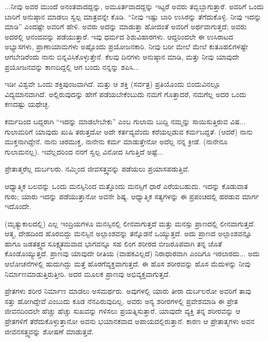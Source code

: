 ...ನೀವು ಅವರ ಮುಂದೆ ಅನಂತವಾದದ್ದನ್ನು, ಅಮೂರ್ತವಾದದ್ದನ್ನು ಇಟ್ಟರೆ ಅವರು ತಬ್ಬಿಬ್ಬಾಗುತ್ತಾರೆ. ಅವರಿಗೆ ಒಂದು ಬಾರಿಗೆ ಅನುಷ್ಠಾನ ಮಾಡಲು ಸ್ವಲ್ಪ ಮಾತ್ರವನ್ನೇ ಕೊಡಿ. “ನೀವು ಇಷ್ಟು ಬಾರಿ ಉಸಿರನ್ನು ತೆಗೆದುಕೊಳ್ಳಿ. ನೀವು ಇದನ್ನು ಮಾಡಿ'' ಎಂದಷ್ಟೇ ಅವರಿಗೆ ಹೇಳಿ. ಅವರು ಅದನ್ನು ಮಾಡುತ್ತಾ ಹೋದಂತೆ ಅವರಿಗೆ ಅರ್ಥವಾಗುತ್ತದೆ; ಅವರು ಅದರಲ್ಲಿ ಆನಂದವನ್ನು ಪಡೆಯುತ್ತಾರೆ. ಇವು ಧರ್ಮದ ಶಿಶುವಿಹಾರಗಳು. ಆದ್ದರಿಂದಲೇ ಈ ಉಸಿರಾಟದ ಅಭ್ಯಾಸಗಳು, ಪ್ರಾಣಾಯಾಮಗಳು ಅಷ್ಟೊಂದು ಪ್ರಯೋಜನಕಾರಿ. ನೀವು ಬರೀ ಮೇಲೆ ಮೇಲೆ ಕುತೂಹಲಿಗಳಷ್ಟೇ ಆಗಬೇಡಿರೆಂದು ನಾನು ಬಿನ್ನವಿಸಿಕೊಳ್ಳುತ್ತೇನೆ. ಕೆಲವು ದಿನಗಳು ಅನುಷ್ಠಾನ ಮಾಡಿ, ಮತ್ತು ನೀವು ಯಾವುದೇ ಪ್ರಯೋಜನವನ್ನು ಕಾಣದಿದ್ದಲ್ಲಿ ಆಗ ಬಂದು ನನ್ನನ್ನು ಶಪಿಸಿ...

\vskip 6pt

ಇಡೀ ವಿಶ್ವವೇ ಒಂದು ಶಕ್ತಿಪುಂಜವಾಗಿದೆ. ಮತ್ತು ಆ ಶಕ್ತಿ (ಸರ್ವತ್ರ) ಪ್ರತಿಯೊಂದು ಬಿಂದುವಿನಲ್ಲೂ ವಿದ್ಯಮಾನವಾಗಿದೆ. ಅಲ್ಲಿರುವುದನ್ನು ಹೇಗೆ ಪಡೆಯಬೇಕೆಂಬುದು ನಮಗೆ ಗೊತ್ತಾದರೆ, ನಮಗೆಲ್ಲ ಅದರ ಒಂದು ಕಣದಷ್ಟು ಯಥೇಚ್ಛ.

\vskip 6pt

ಕರ್ಮದಿಂದ ಬದ್ದರಾಗಿ “ಇದನ್ನು ಮಾಡಲೇಬೇಕು” ಎಂಬ ಗುಲಾಮ ಬುದ್ದಿ ನಮ್ಮನ್ನು ಸಾಯಿಸುತ್ತಿರುವ ವಿಷ... ಗುಲಾಮರಿಗೆ ಯಾವುದು ಖುಷಿ ತರುತ್ತದೋ ಅದೇ ಕರ್ತವ್ಯವೆಂದು ಕರೆಯಲ್ಪಡುವ ಕರ್ಮಬದ್ದತೆ. (ಆದರೆ) ನಾನು ಮುಕ್ತನಾಗಿದ್ದೇನೆ. ನಾನು ಚಿರಮುಕ್ತ, ನಾನೇನು ಕರ್ಮ ಮಾಡುತ್ತೇನೋ ಅದೆಲ್ಲ ನನ್ನ ಕ್ರೀಡೆ. (ನಾನೇನೂ ಗುಲಾಮನಲ್ಲ). ಇವೆಲ್ಲದರಿಂದ ನನಗೆ ಸ್ವಲ್ಪ ವಿನೋದ ಸಿಗುತ್ತಿದೆ ಅಷ್ಟೆ...

\vskip 6pt

ಪ್ರೇತಾತ್ಮರೆಲ್ಲ ದುರ್ಬಲರು. ನಮ್ಮಿಂದ ಜೀವಸತ್ತ್ವವನ್ನು ಪಡೆಯಲು ಪ್ರಯಾಸಪಡುತ್ತಿವೆ.

\vskip 6pt

ಆಧ್ಯಾತ್ಮಿಕ ಬಲವನ್ನು ಒಂದು ಮನಸ್ಸಿನಿಂದ ಮತ್ತೊಂದು ಮನಸ್ಸಿಗೆ ಧಾರೆ ಎರೆಯಬಹುದು. ಇದನ್ನು ಕೊಡುವಾತ ಗುರು; ಯಾರು ಇದನ್ನು ಪಡೆಯುತ್ತಾನೋ ಅವನೇ ಶಿಷ್ಯ. ಆಧ್ಯಾತ್ಮಿಕ ಸತ್ಯಗಳನ್ನು ಈ ಪ್ರಪಂಚದಲ್ಲಿ ಹರಡುವ ಮಾರ್ಗ ಇದೊಂದೇ.

\vskip 6pt

(ಮೃತ್ಯುಕಾಲದಲ್ಲಿ) ಎಲ್ಲ ಇಂದ್ರಿಯಗಳೂ ಮನಸ್ಸಿನಲ್ಲಿ ಲೀನವಾಗುತ್ತದೆ ಮತ್ತು ಮನಸ್ಸು ಪ್ರಾಣದಲ್ಲಿ ಲೀನವಾಗುತ್ತದೆ. ಆತ್ಮ, ದೇಹದಿಂದ ಹೊರಬಿದ್ದು ಮನಸ್ಸಿನ ಅಲ್ಪಾಂಶವನ್ನು ತನ್ನೊಡನೆ ಒಯ್ಯುತ್ತದೆ. ಅದು ಪ್ರಾಣದ ಅಲ್ಪಾಂಶವನ್ನೂ ಹಾಗೂ ಜಡತತ್ತ್ವದ ಸೂಕ್ಷ್ಮತಮವಾದ ಭಾಗವನ್ನೂ ಸಹ ಲಿಂಗ ಶರೀರದ ಬೀಜರೂಪವಾಗಿ ತನ್ನ ಜೊತೆ ಕೊಂಡೊಯ್ಯುತ್ತದೆ. ಪ್ರಾಣವು ಯಾವುದೇ ರೀತಿಯ (ವಾಹಕವಿಲ್ಲದೆ) ನಿರಾಧಾರವಾಗಿ ಎಂದಿಗೂ ಇರಲಾರದು... ಅದು ಆಲೋಚನೆಗಳಲ್ಲಿ ಹುದುಗಿದ್ದು ಮತ್ತೆ ಹೊರಗೆ\break ವ್ಯಕ್ತವಾಗುತ್ತದೆ. ಈ ಹೊಸ ಶರೀರವನ್ನು ಹೊಸ ಮೆದುಳನ್ನು ನೀವು ನಿರ್ಮಾಣ\break ಮಾಡುತ್ತಿರುತ್ತೀರಿ. ಅದರ ಮೂಲಕ ಪ್ರಾಣವು ಅಭಿವ್ಯಕ್ತವಾಗುತ್ತದೆ.

\vskip 6pt

ಪ್ರೇತಗಳು ಶರೀರ ನಿರ್ಮಾಣ ಮಾಡಲು ಅಸಮರ್ಥರು. ಅವುಗಳಲ್ಲಿ ಯಾರು ತೀರಾ ದುರ್ಬಲರೋ ಅವರಿಗೆ ತಾವು ಸತ್ತು ಹೋಗಿದ್ದೇವೆ ಎಂಬುದು ಕೂಡ ನೆನಪಿರುವುದಿಲ್ಲ. ಅವರು ಅನ್ಯ ಶರೀರಗಳಲ್ಲಿ ಪ್ರವೇಶಮಾಡಿ ಈ ಪ್ರೇತ ಜೀವನದಿಂದಲೇ ಹೆಚ್ಚು ಹೆಚ್ಚು ಸುಖವನ್ನು ಗಳಿಸಲು ಪ್ರಯತ್ನಿಸುತ್ತಾರೆ. ಯಾವುದೇ ವ್ಯಕ್ತಿ ತನ್ನ ಶರೀರವನ್ನು ಆ ಪ್ರೇತಗಳಿಗೆ ತೆರೆದುಕೊಳ್ಳುತ್ತಾನೋ ಅವನು ಭಯಾನಕವಾದ ಅಪಾಯದಲ್ಲಿರುತ್ತಾನೆ. ಕಾರಣ ಆ ಪ್ರೇತಾತ್ಮಗಳು ಅವನ ಜೀವನಸತ್ತ್ವವನ್ನು ಶೋಷಣೆ ಮಾಡುತ್ತವೆ.

